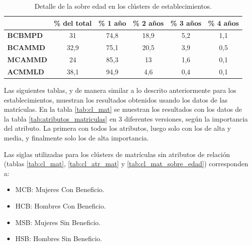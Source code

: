\begin{table}[H]
\centering
\caption{Detalle de la sobre edad en los clústers de establecimientos. }
\label{tab:cl_estab_sobre_edad}
\begin{tabular}{|l|c|c|c|c|c|}
\hline
                & \textbf{\% del total} & \textbf{\% 1 año\footnotemark} & \textbf{\% 2 años\footnotemark[\value{footnote}]\footnotemark[\value{footnote}]} & \textbf{\% 3 años\footnotemark[\value{footnote}]} & \textbf{\% 4 años\footnotemark[\value{footnote}]} \\ \hline
\textbf{BCBMPD} & 31                    & 74,8              & 18,9               & 5,2                & 1,1                \\ \hline
\textbf{BCAMMD} & 32,9                  & 75,1              & 20,5               & 3,9                & 0,5                \\ \hline
\textbf{MCAMMD} & 24                    & 85,3              & 13                 & 1,6                & 0,1                \\ \hline
\textbf{ACMMLD} & 38,1                  & 94,9              & 4,6                & 0,4                & 0,1                \\ \hline
\end{tabular}
\end{table}


Las siguientes tablas, y de manera similar a lo descrito anteriormente para los establecimientos, muestran los resultados obtenidos usando los datos de las matrículas. En la tabla \ref{tab:cl_mat} se muestran los resultados con los datos de la tabla \ref{tab:atributos_matriculas} en 3 diferentes versiones, según la importancia del atributo. La primera con todos los atributos, luego solo con los de alta y media, y finalmente solo los de alta importancia.

Las siglas utilizadas para los clústers de matrículas sin atributos de relación (tablas \ref{tab:cl_mat}, \ref{tab:cl_atr_mat} y \ref{tab:cl_mat_sobre_edad}) corresponden a:

\begin{itemize}
    \item MCB: Mujeres Con Beneficio.
    \item HCB: Hombres Con Beneficio.
    \item MSB: Mujeres Sin Beneficio.
    \item HSB: Hombres Sin Beneficio.
\end{itemize}

